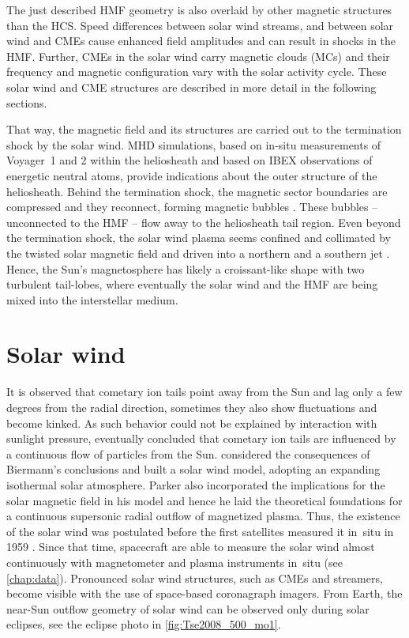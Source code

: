 The just described HMF geometry is also overlaid by other magnetic structures than the HCS. Speed differences between solar wind streams, and between solar wind and CMEs cause enhanced field amplitudes and can result in shocks in the HMF. Further, CMEs in the solar wind carry magnetic clouds (MCs) and their frequency and magnetic configuration vary with the solar activity cycle. These solar wind and CME structures are described in more detail in the following sections.

That way, the magnetic field and its structures are carried out to the termination shock by the solar wind. MHD simulations, based on in-situ measurements of Voyager~1 and 2 within the heliosheath and based on IBEX observations of energetic neutral atoms, provide indications about the outer structure of the heliosheath. Behind the termination shock, the magnetic sector boundaries are compressed and they reconnect, forming magnetic bubbles \citep{Opher2011}. These bubbles -- unconnected to the HMF -- flow away to the heliosheath tail region. Even beyond the termination shock, the solar wind plasma seems confined and collimated by the twisted solar magnetic field and driven into a northern and a southern jet \citep{Opher2015}. Hence, the Sun's magnetosphere has likely a croissant-like shape with two turbulent tail-lobes, where eventually the solar wind and the HMF are being mixed into the interstellar medium.


\section{Solar wind}
\label{sec:solar_wind}
It is observed that cometary ion tails point away from the Sun and lag only a few degrees from the radial direction, sometimes they also show fluctuations and become kinked. As such behavior could not be explained by interaction with sunlight pressure, eventually \citet{Biermann1951} concluded that cometary ion tails are influenced by a continuous flow of particles from the Sun.	%
\citet{Parker1958} considered the consequences of Biermann's conclusions and built a solar wind model, adopting an expanding isothermal solar atmosphere. Parker also incorporated the implications for the solar magnetic field in his model and hence he laid the theoretical foundations for a continuous supersonic radial outflow of magnetized plasma. Thus, the existence of the solar wind was postulated before the first satellites measured it in~situ in 1959 \citep{Gringauz1960,Neugebauer1966}. Since that time, spacecraft are able to measure the solar wind almost continuously with magnetometer and plasma instruments in~situ (see \autoref{chap:data}). Pronounced solar wind structures, such as CMEs and streamers, become visible with the use of space-based coronagraph imagers. From Earth, the near-Sun outflow geometry of solar wind can be observed only during solar eclipses, see the eclipse photo in \autoref{fig:Tse2008_500_mo1}.

